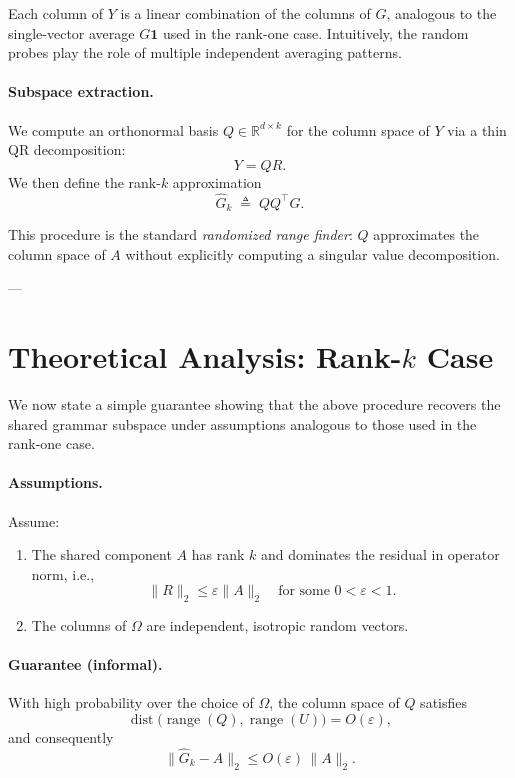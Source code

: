 \documentclass[11pt]{report}
\begin{document}
Each column of $Y$ is a linear combination of the columns of $G$, analogous to the
single-vector average $G\mathbf{1}$ used in the rank-one case.
Intuitively, the random probes play the role of multiple independent averaging
patterns.

\paragraph{Subspace extraction.}
We compute an orthonormal basis $Q \in \mathbb{R}^{d\times k}$ for the column space
of $Y$ via a thin QR decomposition:
\begin{equation}
Y = QR.
\end{equation}
We then define the rank-$k$ approximation
\begin{equation}
\widehat{G}_k \;\triangleq\; QQ^\top G.
\end{equation}

This procedure is the standard \emph{randomized range finder}: $Q$ approximates the
column space of $A$ without explicitly computing a singular value decomposition.

---

\section{Theoretical Analysis: Rank-$k$ Case}
\label{sec:rank_k_analysis}

We now state a simple guarantee showing that the above procedure recovers the shared
grammar subspace under assumptions analogous to those used in the rank-one case.

\paragraph{Assumptions.}
Assume:
\begin{enumerate}
    \item The shared component $A$ has rank $k$ and dominates the residual in operator
    norm, i.e.,
    \[
    \|R\|_2 \le \varepsilon \|A\|_2
    \quad \text{for some } 0 < \varepsilon < 1.
    \]
    \item The columns of $\Omega$ are independent, isotropic random vectors.
\end{enumerate}

\paragraph{Guarantee (informal).}
With high probability over the choice of $\Omega$, the column space of $Q$ satisfies
\[
\operatorname{dist}\bigl(\operatorname{range}(Q),\operatorname{range}(U)\bigr)
= O(\varepsilon),
\]
and consequently
\[
\| \widehat{G}_k - A \|_2 \le O(\varepsilon)\,\|A\|_2.
\]
\end{document}

